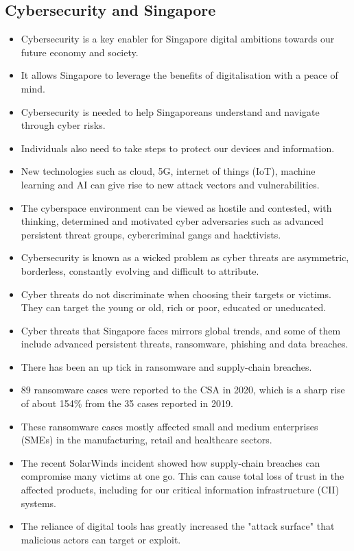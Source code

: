 \documentclass[11pt]{article}
\begin{document}
\subsection{Cybersecurity and Singapore}
\label{sec:org7dc8c2d}
\begin{itemize}
\item Cybersecurity is a key enabler for Singapore digital ambitions towards our future economy and society.
\item It allows Singapore to leverage the benefits of digitalisation with a peace of mind.
\item Cybersecurity is needed to help Singaporeans understand and navigate through cyber risks.
\item Individuals also need to take steps to protect our devices and information.
\item New technologies such as cloud, 5G, internet of things (IoT), machine learning and AI can give rise to new attack vectors and vulnerabilities.
\item The cyberspace environment can be viewed as hostile and contested, with thinking, determined and motivated cyber adversaries such as advanced persistent threat groups, cybercriminal gangs and hacktivists.
\item Cybersecurity is known as a wicked problem as cyber threats are asymmetric, borderless, constantly evolving and difficult to attribute.
\item Cyber threats do not discriminate when choosing their targets or victims. They can target the young or old, rich or poor, educated or uneducated.
\item Cyber threats that Singapore faces mirrors global trends, and some of them include advanced persistent threats, ransomware, phishing and data breaches.
\item There has been an up tick in ransomware and supply-chain breaches.
\item 89 ransomware cases were reported to the CSA in 2020, which is a sharp rise of about 154\% from the 35 cases reported in 2019.
\item These ransomware cases mostly affected small and medium enterprises (SMEs) in the manufacturing, retail and healthcare sectors.
\item The recent SolarWinds incident showed how supply-chain breaches can compromise many victims at one go. This can cause total loss of trust in the affected products, including for our critical information infrastructure (CII) systems.
\item The reliance of digital tools has greatly increased the "attack surface" that malicious actors can target or exploit.
\end{itemize}
\end{document}
